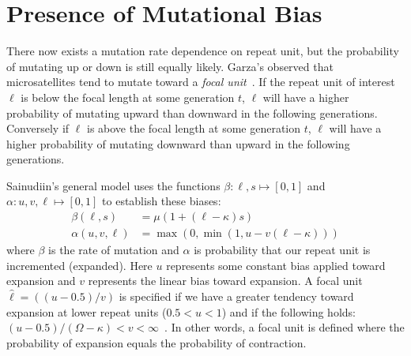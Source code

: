 \section{Presence of Mutational Bias}\label{sec:presenceOfMutationalBias}
There now exists a mutation rate dependence on repeat unit, but the probability of mutating up or down is still
equally likely.
Garza's observed that microsatellites tend to mutate toward a \emph{focal
unit}~\cite{garzaMicrosatelliteAlleleFrequencies1995}.
If the repeat unit of interest $\ell$ is below the focal length at some generation $t$, $\ell$ will have a higher
probability of mutating upward than downward in the following generations.
Conversely if $\ell$ is above the focal length at some generation $t$, $\ell$ will have a higher probability of
mutating downward than upward in the following generations.

Sainudiin's general model uses the functions $\beta : \ell, s \mapsto [0, 1]$ and $\alpha : u, v, \ell \mapsto [0, 1]$
to establish these biases:
\begin{align}
    \beta(\ell, s) &= \mu (1 + (\ell - \kappa)s) \\
    \alpha(u, v, \ell) &= \max (0, \min(1, u - v(\ell - \kappa)))
\end{align}
where $\beta$ is the rate of mutation and $\alpha$ is probability that our repeat unit is incremented (expanded).
Here $u$ represents some constant bias applied toward expansion and $v$ represents the linear bias toward expansion.
A focal unit $\hat{\ell} = ((u - 0.5) / v)$ is specified if we have a greater tendency toward
expansion at lower repeat units ($0.5 < u < 1$) and if the following holds:
$(u - 0.5) / (\Omega - \kappa) < v < \infty$~\cite{sainudiinMicrosatelliteMutationModels2004}.
In other words, a focal unit is defined where the probability of expansion equals the probability of contraction.

